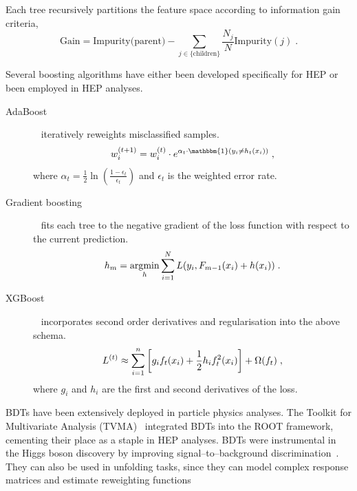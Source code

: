             Each tree recursively partitions the feature space according to information gain criteria,
            \begin{equation}
                \text{Gain} = \text{Impurity(parent)} - \sum_{j \in \{\text{children}\}} \frac{N_j}{N} \text{Impurity}(j)\;.
            \end{equation}
            
            Several boosting algorithms have either been developed specifically for HEP or been employed in HEP analyses.
            \begin{description}
                \item[AdaBoost]~\cite{Hastie2009Multi-classAdaBoost,Freund1995ABoosting} iteratively reweights misclassified samples.
                \begin{equation}
                    w_i^{(t+1)} = w_i^{(t)} \cdot e^{\alpha_t \cdot \mathbbm{1}(y_i \neq h_t(x_i))}\;,
                \end{equation}
                where \(\alpha_t = \frac{1}{2}\ln\left(\frac{1-\epsilon_t}{\epsilon_t}\right)\) and \(\epsilon_t\) is the weighted error rate.
                
                \item[Gradient boosting]~\cite{hastie_boosting_2009} fits each tree to the negative gradient of the loss function with respect to the current prediction.
                \begin{equation}
                    h_m = \operatorname*{\arg\!\min}_h \sum_{i=1}^N L(y_i, F_{m-1}(x_i) + h(x_i))\;.
                \end{equation}
                \item[XGBoost]~\cite{Chen:2016btl,noauthor_dmlcxgboost_2025} incorporates second order derivatives and regularisation into the above schema.
                \begin{equation}
                    {L}^{(t)} \approx \sum_{i=1}^n \qty[g_i f_t(x_i) + \frac{1}{2} h_i f_t^2(x_i)] + \Omega(f_t)\;,
                \end{equation}
            where \(g_i\) and \(h_i\) are the first and second derivatives of the loss.
            \end{description}
            
            BDTs have been extensively deployed in particle physics analyses.
            The Toolkit for Multivariate Analysis (TVMA)~\cite{Voss:2007jxm} integrated BDTs into the ROOT framework, cementing their place as a staple in HEP analyses.
            BDTs were instrumental in the Higgs boson discovery by improving signal--to--background discrimination~\cite{glaysher_bdts_nodate}.
            They can also be used in unfolding tasks, since they can model complex response matrices and estimate reweighting functions
            
